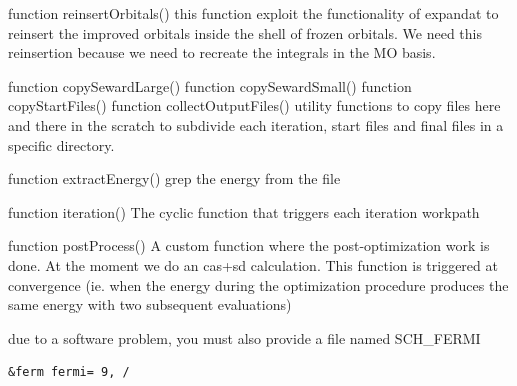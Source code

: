 \documentclass[a4paper,11pt]{report}
\begin{document}
function reinsertOrbitals()
  this function exploit the functionality of expandat to reinsert the
  improved orbitals inside the shell of frozen orbitals. We need this
  reinsertion because we need to recreate the integrals in the MO basis.

function copySewardLarge()
function copySewardSmall()
function copyStartFiles()
function collectOutputFiles()
  utility functions to copy files here and there in the scratch
  to subdivide each iteration, start files and final files in a
  specific directory. 

function extractEnergy()
  grep the energy from the file

function iteration()
  The cyclic function that triggers each iteration workpath

function postProcess()
  A custom function where the post-optimization work is done.
  At the moment we do an cas+sd calculation. This function is triggered
  at convergence (ie. when the energy during the optimization procedure
  produces the same energy with two subsequent evaluations)

due to a software problem, you must also provide a file named SCH\_FERMI
\begin{verbatim}
&ferm fermi= 9, /
\end{verbatim}
\end{document}
